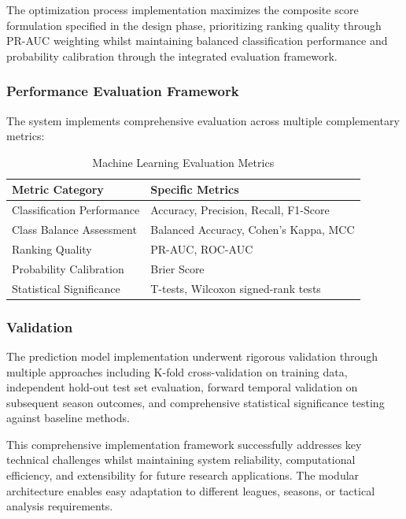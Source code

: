 The optimization process implementation maximizes the composite score formulation specified in the design phase, prioritizing ranking quality through PR-AUC weighting whilst maintaining balanced classification performance and probability calibration through the integrated evaluation framework.

\subsubsection{Performance Evaluation Framework}

The system implements comprehensive evaluation across multiple complementary metrics:

\begin{table}[h]
\centering
\caption{Machine Learning Evaluation Metrics}
\label{tab:ml_metrics}
\begin{tabular}{ll}
\toprule
\textbf{Metric Category} & \textbf{Specific Metrics} \\
\midrule
Classification Performance & Accuracy, Precision, Recall, F1-Score \\
Class Balance Assessment & Balanced Accuracy, Cohen's Kappa, MCC \\
Ranking Quality & PR-AUC, ROC-AUC \\
Probability Calibration & Brier Score \\
Statistical Significance & T-tests, Wilcoxon signed-rank tests \\
\bottomrule
\end{tabular}
\end{table}

\subsubsection{Validation}

The prediction model implementation underwent rigorous validation through multiple approaches including K-fold cross-validation on training data, independent hold-out test set evaluation, forward temporal validation on subsequent season outcomes, and comprehensive statistical significance testing against baseline methods.

This comprehensive implementation framework successfully addresses key technical challenges whilst maintaining system reliability, computational efficiency, and extensibility for future research applications. The modular architecture enables easy adaptation to different leagues, seasons, or tactical analysis requirements.
